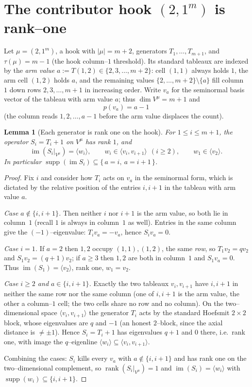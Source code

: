 \documentclass[11pt]{article}
\newtheorem{lemma}[theorem]{Lemma}
\theoremstyle{definition}
\DeclareMathOperator{\im}{im}
\DeclareMathOperator{\rank}{rank}
\DeclareMathOperator{\supp}{supp}
\newcommand{\Vmu}{V^\mu}
\begin{document}
\section{The contributor hook $(2,1^m)$ is rank--one}\label{sec:hook}

Let $\mu=(2,1^m)$, a hook with $|\mu|=m+2$, generators $T_1,\dots,T_{m+1}$, and
$\tau(\mu)=m-1$ (the hook column--$1$ threshold). Its standard tableaux are indexed by the
\emph{arm value} $a:=T(1,2)\in\{2,3,\dots,m+2\}$: cell $(1,1)$ always holds $1$, the arm
cell $(1,2)$ holds $a$, and the remaining values $\{2,\dots,m+2\}\setminus\{a\}$ fill
column~$1$ down rows $2,3,\dots,m+1$ in increasing order. Write $v_a$ for the seminormal
basis vector of the tableau with arm value $a$; thus $\dim\Vmu=m+1$ and
\begin{equation}\label{eq:p-of-a}
   p(v_a)=a-1
\end{equation}
(the column reads $1,2,\dots,a-1$ before the arm value displaces the count).

\begin{lemma}[Each generator is rank one on the hook]\label{lem:rank1}
For $1\le i\le m+1$, the operator $S_i=T_i+1$ on $\Vmu$ has rank $1$, and
\[
   \im(S_i|_{\Vmu})=\langle w_i\rangle,\qquad
   w_i\in\langle v_i,v_{i+1}\rangle\ \ (i\ge2),\qquad w_1\in\langle v_2\rangle .
\]
In particular $\supp(\im S_i)\subseteq\{\,a=i,\ a=i+1\,\}$.
\end{lemma}

\begin{proof}
Fix $i$ and consider how $T_i$ acts on $v_a$ in the seminormal form, which is dictated by
the relative position of the entries $i,i+1$ in the tableau with arm value $a$.

\emph{Case $a\notin\{i,i+1\}$.} Then neither $i$ nor $i+1$ is the arm value, so both lie in
column~$1$ (recall $1$ is always in column~$1$ as well). Entries in the same column give the
$(-1)$--eigenvalue: $T_iv_a=-v_a$, hence $S_iv_a=0$.

\emph{Case $i=1$.} If $a=2$ then $1,2$ occupy $(1,1),(1,2)$, the same \emph{row}, so
$T_1v_2=qv_2$ and $S_1v_2=(q+1)v_2$; if $a\ge3$ then $1,2$ are both in column~$1$ and
$S_1v_a=0$. Thus $\im(S_1)=\langle v_2\rangle$, rank one, $w_1=v_2$.

\emph{Case $i\ge2$ and $a\in\{i,i+1\}$.} Exactly the two tableaux $v_i,v_{i+1}$ have $i,i+1$
in neither the same row nor the same column (one of $i,i+1$ is the arm value, the other a
column--$1$ cell; the two cells share no row and no column). On the two--dimensional space
$\langle v_i,v_{i+1}\rangle$ the generator $T_i$ acts by the standard Hoefsmit $2\times2$
block, whose eigenvalues are $q$ and $-1$ (an honest $2$--block, since the axial distance is
$\neq\pm1$). Hence $S_i=T_i+1$ has eigenvalues $q+1$ and $0$ there, i.e.\ rank one, with
image the $q$--eigenline $\langle w_i\rangle\subseteq\langle v_i,v_{i+1}\rangle$.

Combining the cases: $S_i$ kills every $v_a$ with $a\notin\{i,i+1\}$ and has rank one on the
two--dimensional complement, so $\rank(S_i|_{\Vmu})=1$ and
$\im(S_i)=\langle w_i\rangle$ with $\supp(w_i)\subseteq\{i,i+1\}$.
\end{proof}
\end{document}
